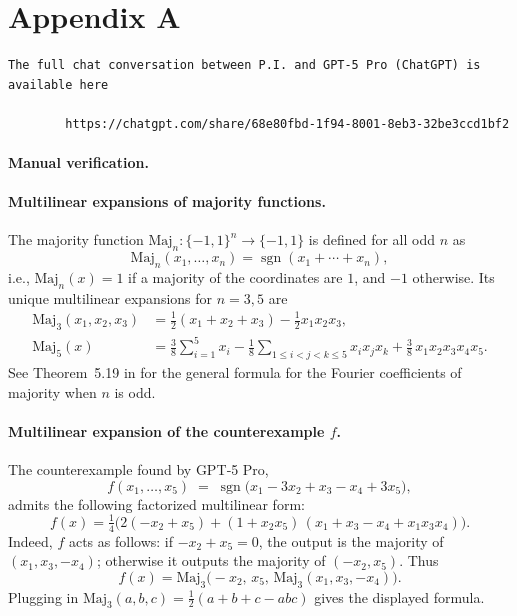 \documentclass[11pt]{article}
\DeclareMathOperator{\sgn}{sgn}
\newcommand{\Maj}{\mathrm{Maj}}
\begin{document}
\appendix
\section*{Appendix A}
\small

\begin{verbatim}
The full chat conversation between P.I. and GPT-5 Pro (ChatGPT) is available here

        https://chatgpt.com/share/68e80fbd-1f94-8001-8eb3-32be3ccd1bf2
\end{verbatim}

\paragraph{Manual verification.}

\paragraph{Multilinear expansions of majority functions.}
The majority function $\Maj_n: \{-1,1\}^n \to \{-1,1\}$ is defined for all odd $n$ as
\[
\Maj_n(x_1,\dots,x_n)=\sgn(x_1+\cdots+x_n),
\]
i.e., $\Maj_n(x) = 1$ if a majority of the coordinates are $1$, and $-1$ otherwise. Its unique multilinear expansions for $n=3,5$ are
\begin{align*}
\Maj_3(x_1,x_2,x_3)&= \tfrac{1}{2}(x_1+x_2+x_3) - \tfrac{1}{2}x_1x_2x_3,\\
\Maj_5(x)
&=\tfrac{3}{8}\sum_{i=1}^5 x_i
-\tfrac{1}{8}\!\!\sum_{1\le i<j<k\le 5}\!\! x_i x_j x_k
+\tfrac{3}{8}\, x_1 x_2 x_3 x_4 x_5.
\end{align*}
See Theorem~5.19 in \cite{ODbook21} for the general formula for the Fourier coefficients of majority when $n$ is odd.

\paragraph{Multilinear expansion of the counterexample $f$.}
The counterexample found by GPT‑5 Pro,
\[
f(x_1,\ldots,x_5)\;=\;\sgn\!\big(x_1 - 3x_2+x_3 -x_4+3x_5\big),
\]
admits the following factorized multilinear form:
\[
f(x)=\tfrac14\Big(2(-x_2+x_5)+(1+x_2x_5)\,(x_1+x_3-x_4+x_1x_3x_4)\Big).
\]
Indeed, $f$ acts as follows: if $-x_2+x_5=0$, the output is the majority of $(x_1,x_3,-x_4)$; otherwise it outputs the majority of $(-x_2,x_5)$. Thus
\[
f(x)=\Maj_3\!\big(-x_2,\,x_5,\,\Maj_3(x_1,x_3,-x_4)\big).
\]
Plugging in $\Maj_3(a,b,c)=\tfrac12(a+b+c-abc)$ gives the displayed formula.
\end{document}
